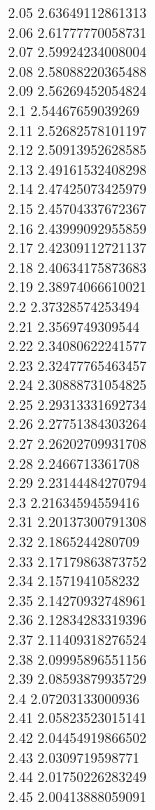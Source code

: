 {2.05	2.63649112861313\\
2.06	2.61777770058731\\
2.07	2.59924234008004\\
2.08	2.58088220365488\\
2.09	2.56269452054824\\
2.1	2.54467659039269\\
2.11	2.52682578101197\\
2.12	2.50913952628585\\
2.13	2.49161532408298\\
2.14	2.47425073425979\\
2.15	2.45704337672367\\
2.16	2.43999092955859\\
2.17	2.42309112721137\\
2.18	2.40634175873683\\
2.19	2.38974066610021\\
2.2	2.37328574253494\\
2.21	2.3569749309544\\
2.22	2.34080622241577\\
2.23	2.32477765463457\\
2.24	2.30888731054825\\
2.25	2.29313331692734\\
2.26	2.27751384303264\\
2.27	2.26202709931708\\
2.28	2.2466713361708\\
2.29	2.23144484270794\\
2.3	2.21634594559416\\
2.31	2.20137300791308\\
2.32	2.1865244280709\\
2.33	2.17179863873752\\
2.34	2.1571941058232\\
2.35	2.14270932748961\\
2.36	2.12834283319396\\
2.37	2.11409318276524\\
2.38	2.09995896551156\\
2.39	2.08593879935729\\
2.4	2.07203133000936\\
2.41	2.05823523015141\\
2.42	2.04454919866502\\
2.43	2.0309719598771\\
2.44	2.01750226283249\\
2.45	2.00413888059091\\
}
